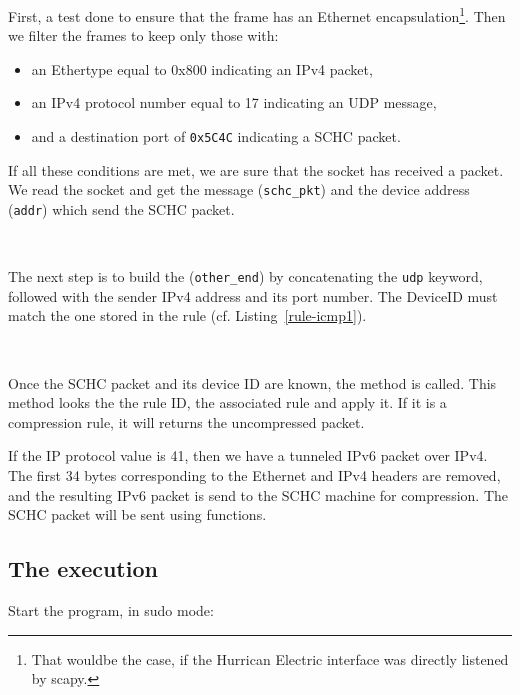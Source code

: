 
First, a test done to ensure that the frame has an Ethernet encapsulation\footnote{That wouldbe the case, if the Hurrican Electric interface was directly listened by scapy.}. Then we filter the frames to keep only those with:
\begin{itemize}
    \item an Ethertype equal to 0x800 indicating an IPv4 packet,
    \item an IPv4 protocol number equal to 17 indicating an UDP message,
    \item and a destination port of \texttt{0x5C4C} indicating a SCHC packet.
\end{itemize}

If all these conditions are met, we are sure that the socket has received a packet. We read the socket and get the message (\texttt{schc\_pkt}) and the device address (\texttt{addr}) which send the SCHC packet. 

~

The next step is to build the  (\texttt{other\_end}) by concatenating the \texttt{udp} keyword, followed with the sender IPv4 address and its port number. The DeviceID must match the one stored in the rule (cf. Listing~\vref{rule-icmp1}).

~~

Once the SCHC packet and its device ID are known, the  method is called. This method looks the the rule ID, the associated rule and apply it. If it is a compression rule, it will returns the uncompressed packet. 


If the IP protocol value is 41, then we have a tunneled IPv6 packet over IPv4. The first 34 bytes corresponding to the Ethernet and IPv4 headers are removed, and the resulting IPv6 packet is send to the SCHC machine for compression. The SCHC packet will be sent using  functions.

\subsection{The execution}

Start the program, in sudo mode:


